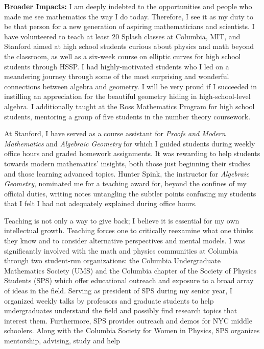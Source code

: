 \documentclass[11pt]{article}
\begin{document}
\newline
\noindent
\textbf{Broader Impacts:} I am deeply indebted to the opportunities and people who made me see mathematics the way I do today. Therefore, I see it as my duty to be that person for a new generation of aspiring
mathematicians and scientists. I have volunteered to teach at least 20 Splash classes at Columbia, MIT, and Stanford
aimed at high school students curious about physics and math beyond the classroom, as well as a six-week course on elliptic curves for high school students through HSSP. I had highly-motivated students
who I led on a meandering journey through some of the most surprising and wonderful connections
between algebra and geometry. I will be very proud if I succeeded in instilling an appreciation for the
beautiful geometry hiding in high-school-level algebra. I additionally taught at the Ross Mathematics Program for high school students, mentoring a group of five students in the number theory coursework.
\par 
At Stanford, I have served as a course assistant for \textit{Proofs and Modern Mathematics} and \textit{Algebraic Geometry} for which I guided students during weekly office hours and graded homework assignments. It was rewarding to help students towards modern mathematics' insights, both those just beginning their studies and those learning advanced topics.  Hunter Spink, the instructor for \textit{Algebraic Geometry}, nominated me for a teaching award for, beyond the confines of my official duties, writing notes untangling the subtler points confusing my students that I felt I had not adequately explained during office hours.
\par
Teaching is not only a way to give back; I believe it is essential for my own intellectual growth. Teaching forces one to critically reexamine what one thinks they know and to consider alternative perspectives and mental models.
I was significantly involved with the math and physics communities at Columbia through two student-run organizations: the Columbia Undergraduate Mathematics Society (UMS) and the Columbia chapter of the
Society of Physics Students (SPS) which offer educational outreach and exposure to a broad array of
ideas in the field. Serving as president of SPS during my senior year, I organized weekly talks by
professors and graduate students to help undergraduates understand the field and possibly find research
topics that interest them. Furthermore, SPS provides outreach and demos for NYC middle schoolers.
Along with the Columbia Society for Women in Physics, SPS organizes mentorship, advising, study and help
\end{document}
